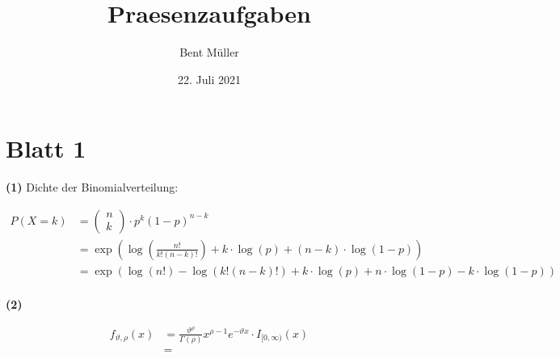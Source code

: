 \documentclass[a4paper]{article}
\begin{document}
\title{ \textbf{Praesenzaufgaben} }
\author{Bent Müller}
\date{22. Juli 2021}
\maketitle

\section*{Blatt 1}

\textbf{(1)} Dichte der Binomialverteilung:

\begin{align*}
	P(X = k) &= \begin{pmatrix} n \\ k \end{pmatrix} 
	\cdot p ^{k} (1-p) ^{n-k} \\
			 &= \exp \left(
				 \log \left(
					 \frac{ n! }{ k! (n-k)! }
				\right) 
				+ k \cdot \log (p) + (n-k) \cdot \log (1-p)
			 \right) \\
			 &= \exp \left(
				 \log \left(
					 n!
				\right) 
				- \log (k! (n-k)!)
				+ k \cdot \log (p) + n \cdot \log (1-p) -
				k \cdot \log (1-p)
			 \right) \\
\end{align*}

\textbf{(2)}

\begin{align*}
	f_{\vartheta , \rho} (x) &= \frac{ \vartheta ^{\rho} }{ \Gamma (\rho) }
	x ^{\rho - 1} e ^{- \vartheta x} \cdot I_{ [ 0, \infty ) } (x) \\
		 &= 
\end{align*}
\end{document}
